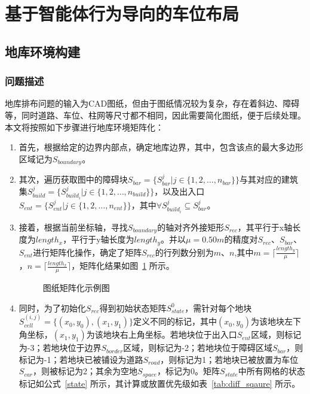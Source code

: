 \section{基于智能体行为导向的车位布局}
\subsection{地库环境构建}
\subsubsection{问题描述}
地库排布问题的输入为CAD图纸，但由于图纸情况较为复杂，存在着斜边、障碍等，同时道路、车位、柱网等尺寸都不相同，因此需要简化图纸，便于后续处理。本文将按照如下步骤进行地库环境矩阵化：
\begin{enumerate}
    \item 首先，根据给定的边界内部点，确定地库边界，其中，包含该点的最大多边形区域记为$S_{boundary}$。
    \item 其次，遍历获取图中的障碍块$S_{bar}=\{S_{bar}^{j}|j\in \{1,2,\dots,n_{bar}\}\}$与其对应的建筑集$S_{build}^{j}=\{S_{build_i}^{j}|j\in \{1,2,\dots,n_{build}\}\}$，以及出入口$S_{ent}=\{S_{ent}^{j}|j\in \{1,2,\dots,n_{ent}\}\}$，其中$\forall S_{build_i}^{j} \subseteq S_{bar}^{j}$。
    \item 接着，根据当前坐标轴，寻找$S_{boundary}$的轴对齐外接矩形$S_{rec}$，其平行于x轴长度为$length_x$，平行于y轴长度为$length_y$。并以$\mu = 0.50m$的精度\cite{1023719817.nh}对$S_{rec}$、$S_{bar}$、$S_{ent}$进行矩阵化操作，确定了矩阵$S_{rec}$的行列数分别为$m$、$n$,其中$m=\lceil \frac{length_y}{\mu} \rceil$，$n=\lceil \frac{length_x}{\mu} \rceil$，矩阵化结果如图~\ref{fig:matrixization} 所示。
          \begin{figure}[!htb]
              \centering
              
              \caption{图纸矩阵化示例图}
              \label{fig:matrixization}
          \end{figure}
    \item 同时，为了初始化$S_{rec}$得到初始状态矩阵$S_{state}^0$，需针对每个地块$S_{cell}^{(i,j)}=\{(x_0,y_0),(x_1,y_1)\}$定义不同的标记，其中$(x_0,y_0)$为该地块左下角坐标，$(x_1,y_1)$为该地块右上角坐标。若地块位于出入口$S_{ent}$区域，则标记为-3；若地块位于边界$S_{border}$区域，则标记为-2；若地块位于障碍区域$S_{bar}$，则标记为-1；若地块已被铺设为道路$S_{road}$，则标记为1；若地块已被放置为车位$S_{car}$，则被标记为2；其余为空地$S_{space}$，标记为0。矩阵$S_{state}$中所有网格的状态标记如公式~\ref{state} 所示，其计算或放置优先级如表~\ref{tab:diff_sqaure} 所示。

\end{enumerate}
